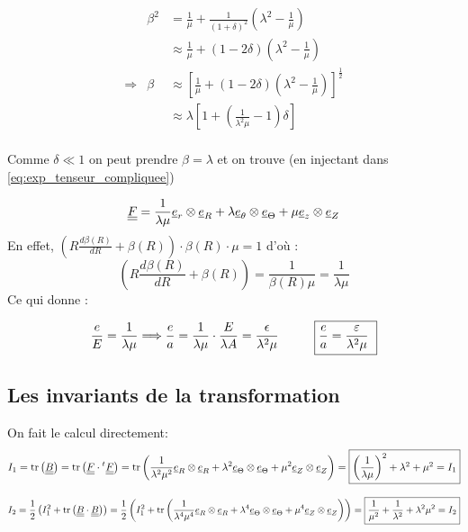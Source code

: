 \documentclass[a4paper,11pt]{article}
\newcommand{\FRAC}{\displaystyle\frac}
\begin{document}
\begin{center}
\begin{displaymath}
\begin{array}{rll}

& \beta^2 & = \FRAC{1}{\mu}+\frac{1}{\left(1+\delta\right)^2}\left(\lambda^2-\frac{1}{\mu}\right)  \\
&  & \displaystyle \approx  \frac{1}{\mu}+\left(1-2\delta\right)\left(\lambda^2-\frac{1}{\mu}\right) \\
\Rightarrow & \beta & \displaystyle \approx \left[\frac{1}{\mu} + \left(1-2\delta \right)\left(\lambda^2 -\frac{1}{\mu} \right) \right]^{\frac{1}{2}} \\
& &\displaystyle \approx \lambda\left[1+\left(\frac{1}{\lambda^2\mu}-1 \right)\delta \right]\\
\end{array}
\end{displaymath}
\end{center}

Comme $\delta \ll 1$ on peut prendre $\beta=\lambda$ et on trouve (en injectant dans \ref{eq:exp_tenseur_compliquee})

$$
\uline{\uline{F}} = \frac{1}{\lambda\mu}\uline{e}_r\otimes\uline{e}_R+\lambda\uline{e}_\theta\otimes\uline{e}_\Theta+\mu\uline{e}_z\otimes\uline{e}_Z $$
En effet,
$\left(R \FRAC{d\beta(R)}{dR} + \beta(R)\right)\cdot \beta(R) \cdot \mu = 1$ d'où :
$$
\left(R \frac{d\beta(R)}{dR} + \beta(R)\right) = \frac{1}{\beta(R) \mu} = \frac{1}{\lambda \mu}
$$
Ce qui donne :

$$ \frac{e}{E} = \frac{1}{\lambda\mu} \Longrightarrow \frac{e}{a} = \frac{1}{\lambda\mu} \cdot \frac{E}{\lambda A} = \frac{ \epsilon}{\lambda^2 \mu} \hspace{1cm} \fbox{$\FRAC{e}{a} = \FRAC{\varepsilon}{\lambda^2 \mu}$ }
$$


\subsection{Les invariants de la transformation}
On fait le calcul directement:
$$I_1=\text{tr}\left(\uline{\uline{B}}\right) = \text{tr}\left(\uline{\uline{F}}\cdot{}^{t}\uline{\uline{F}}\right) = \text{tr}\left(\frac{1}{\lambda^2\mu^2}\uline{e}_R\otimes\uline{e}_R + \lambda^2\uline{e}_\Theta\otimes\uline{e}_\Theta + \mu^2\uline{e}_Z\otimes\uline{e}_Z \right)=\fbox{$\left(\FRAC{1}{\lambda\mu}\right)^2+\lambda^2+\mu^2 = I_1$}$$

$$I_2 = \frac{1}{2}\left(I_1^2+\text{tr}\left(\uline{\uline{B}}\cdot\uline{\uline{B}}\right)\right) = \frac{1}{2}\left(I_1^2+\text{tr}\left( \frac{1}{\lambda^4\mu^4}\uline{e}_R\otimes\uline{e}_R + \lambda^4\uline{e}_\Theta\otimes\uline{e}_\Theta + \mu^4\uline{e}_Z\otimes\uline{e}_Z \right)\right)  = \fbox{$\FRAC{1}{\mu^2}+\frac{1}{\lambda^2}+\lambda^2\mu^2 = I_2$}$$
\end{document}
